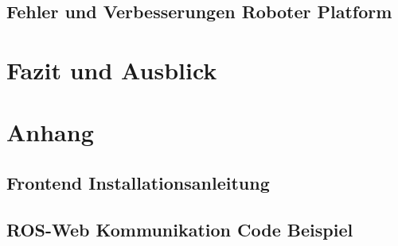 \documentclass[11pt,oneside,a4paper,titlepage]{article}
\begin{document}
\subsection{Fehler und Verbesserungen Roboter Platform}


\section{Fazit und Ausblick}

\section{Anhang}
\subsection{Frontend Installationsanleitung}


\subsection{ROS-Web Kommunikation Code Beispiel}


\newpage
\listoffigures

\newpage


\end{document}
